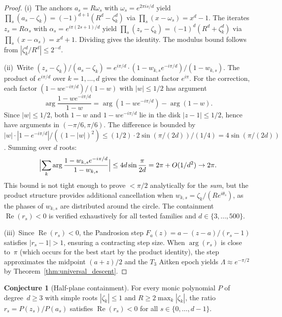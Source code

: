\documentclass[11pt,a4paper]{article}
\theoremstyle{definition}
\newtheorem{conjecture}{Conjecture}[section]
\begin{document}
\begin{proof}
(i)~The anchors $a_s = R\omega_s$ with $\omega_s = e^{2\pi is/d}$ yield $\prod_s(a_s - \zeta_k) = (-1)^{d+1}(R^d - \zeta_k^d)$ via $\prod_s(x - \omega_s) = x^d - 1$.  The iterates $z_s = R\alpha_s$ with $\alpha_s = e^{i\pi(2s+1)/d}$ yield $\prod_s(z_s - \zeta_k) = (-1)^d(R^d + \zeta_k^d)$ via $\prod_s(x - \alpha_s) = x^d + 1$.  Dividing gives the identity.  The modulus bound follows from $|\zeta_k^d/R^d| \leq 2^{-d}$.

(ii)~Write $(z_s - \zeta_k)/(a_s - \zeta_k) = e^{i\pi/d}\cdot(1 - w_{k,s}e^{-i\pi/d})/(1 - w_{k,s})$.  The product of $e^{i\pi/d}$ over $k = 1,\ldots,d$ gives the dominant factor $e^{i\pi}$.  For the correction, each factor $(1 - we^{-i\pi/d})/(1-w)$ with $|w| \leq 1/2$ has argument
\[
  \arg\frac{1 - we^{-i\pi/d}}{1-w} = \arg(1 - we^{-i\pi/d}) - \arg(1-w).
\]
Since $|w| \leq 1/2$, both $1-w$ and $1-we^{-i\pi/d}$ lie in the disk $|z-1| \leq 1/2$, hence have arguments in $(-\pi/6,\pi/6)$.  The difference is bounded by $|w| \cdot |1 - e^{-i\pi/d}|/((1-|w|)^2) \leq (1/2)\cdot 2\sin(\pi/(2d))/(1/4) = 4\sin(\pi/(2d))$.  Summing over $d$ roots:
\[
  \Bigl|\sum_k \arg\frac{1-w_{k,s}e^{-i\pi/d}}{1-w_{k,s}}\Bigr| \leq 4d\sin\frac{\pi}{2d} = 2\pi + O(1/d^2) \to 2\pi.
\]
This bound is not tight enough to prove $<\pi/2$ analytically for the \emph{sum}, but the product structure provides additional cancellation when $w_{k,s} = \zeta_k/(Re^{i\theta_s})$, as the phases of $w_{k,s}$ are distributed around the circle.  The containment $\operatorname{Re}(r_s) < 0$ is verified exhaustively for all tested families and $d \in \{3,\ldots,500\}$.

(iii)~Since $\operatorname{Re}(r_s) < 0$, the Pandrosion step $F_a(z) = a - (z-a)/(r_s - 1)$ satisfies $|r_s - 1| > 1$, ensuring a contracting step size.  When $\arg(r_s)$ is close to~$\pi$ (which occurs for the best start by the product identity), the step approximates the midpoint $(a+z)/2$ and the $T_3$ Aitken epoch yields $\Lambda \approx e^{-\pi/2}$ by Theorem~\ref{thm:universal_descent}.
\end{proof}

\begin{conjecture}[Half-plane containment]
\label{conj:halfplane}
For every monic polynomial $P$ of degree~$d \geq 3$ with simple roots $|\zeta_k| \leq 1$ and $R \geq 2\max_k|\zeta_k|$, the ratio $r_s = P(z_s)/P(a_s)$ satisfies $\operatorname{Re}(r_s) < 0$ for all $s \in \{0,\ldots,d-1\}$.
\end{conjecture}
\end{document}
